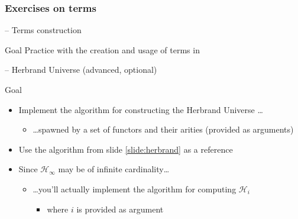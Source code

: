 \documentclass[presentation]{beamer}\mode<presentation>{\usetheme{AMSBolognaFC}}
\begin{document}
\subsubsection{Exercises on terms}

\startExercise{}
\begin{frame}{\currentExercise{} -- Terms construction}
    \label{slide:first-exercise-on-terms}

    \begin{block}{Goal}
        Practice with the creation and usage of terms in \twopkt{}
    \end{block}
    
\end{frame}

\startExercise{}

\begin{frame}{\currentExercise{} -- Herbrand Universe \hfill (advanced, \alert{optional})}
    \label{slide:second-exercise-on-terms}

    \begin{block}{Goal}
        \begin{itemize}
            \item Implement the algorithm for constructing the Herbrand Universe \ldots
            \begin{itemize}
                \item \ldots spawned by a set of functors and their arities (provided as arguments)
            \end{itemize}

            \item Use the algorithm from slide \ref{slide:herbrand} as a reference
            
            \item Since $\mathcal{H}_\infty$ may be of infinite cardinality\ldots
            \begin{itemize}
                \item \ldots you'll actually implement the algorithm for computing $\mathcal{H}_i$
                \begin{itemize}
                    \item where $i$ is provided as argument
                \end{itemize}
            \end{itemize}
        \end{itemize}
    \end{block}
\end{frame}
\end{document}
